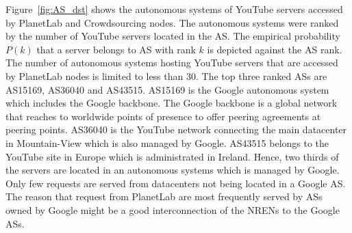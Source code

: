 %

Figure~\ref{fig:AS_dst} shows the autonomous systems of YouTube servers accessed by PlanetLab and Crowdsourcing nodes.
The autonomous systems were ranked by the number of YouTube servers located in the AS.
The empirical probability $P(k)$ that a server belongs to AS with rank $k$ is depicted against the AS rank.
The number of autonomous systems hosting YouTube servers that are accessed by PlanetLab nodes is limited to less than 30.
The top three ranked ASs are AS15169, AS36040 and AS43515.
AS15169 is the Google autonomous system which includes the Google backbone.
The Google backbone is a global network that reaches to worldwide points of presence to offer peering agreements at peering points.
AS36040 is the YouTube network connecting the main datacenter in Mountain-View which is also managed by Google.
AS43515 belongs to the YouTube site in Europe which is administrated in Ireland.
Hence, two thirds of the servers are located in an autonomous systems which is managed by Google.
Only few requests are served from datacenters not being located in a Google AS.
The reason that request from PlanetLab are most frequently served by ASs owned by Google might be a good interconnection of the NRENs to the Google ASs.


